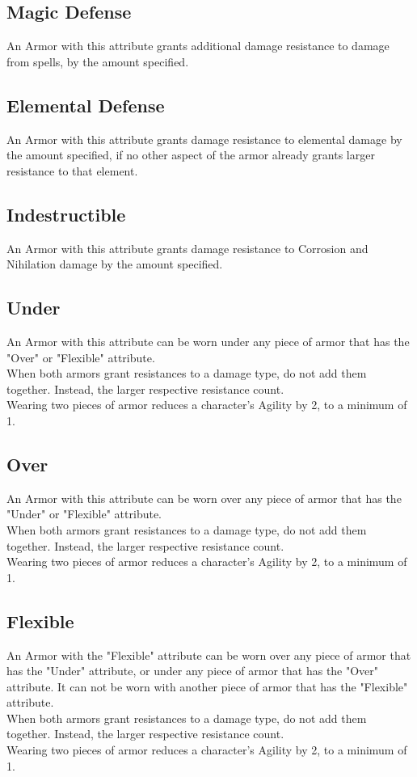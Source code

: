 \subsection{Magic Defense}\label{armor:magicDefense}
An Armor with this attribute grants additional damage resistance to damage from spells, by the amount specified.

\subsection{Elemental Defense}\label{armor:elementalDefense}
An Armor with this attribute grants damage resistance to elemental damage by the amount specified, if no other aspect of the armor already grants larger resistance to that element.

\subsection{Indestructible}\label{armor:indestructible}
An Armor with this attribute grants damage resistance to Corrosion and Nihilation damage by the amount specified.

\subsection{Under}\label{armor:under}
An Armor with this attribute can be worn under any piece of armor that has the "Over" or "Flexible" attribute.\\
When both armors grant resistances to a damage type, do not add them together.
Instead, the larger respective resistance count.\\
Wearing two pieces of armor reduces a character's Agility by 2, to a minimum of 1.

\subsection{Over}\label{armor:over}
An Armor with this attribute can be worn over any piece of armor that has the "Under" or "Flexible" attribute.\\
When both armors grant resistances to a damage type, do not add them together.
Instead, the larger respective resistance count.\\
Wearing two pieces of armor reduces a character's Agility by 2, to a minimum of 1.

\subsection{Flexible}\label{armor:flexible}
An Armor with the "Flexible" attribute can be worn over any piece of armor that has the "Under" attribute, or under any piece of armor that has the "Over" attribute. It can not be worn with another piece of armor that has the "Flexible" attribute.\\
When both armors grant resistances to a damage type, do not add them together.
Instead, the larger respective resistance count.\\
Wearing two pieces of armor reduces a character's Agility by 2, to a minimum of 1.